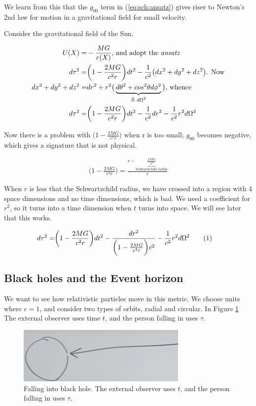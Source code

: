 \documentclass[]{article}
\newcommand\numberthis{\addtocounter{equation}{1}\tag{\theequation}}
\begin{document}
{We learn from this that the $g_00$ term in (\ref{eq:sch:ansatz}) gives riser to Newton's 2nd law for motion in a gravitational field for small velocity.

Consider the gravitational field of the Sun.

\begin{align*}
	U(X) =& - \frac{MG}{r(X)} \text{, and adopt the \emph{ansatz}}\\
		d \tau^2 =& \bigg(1-\frac{2 MG}{c^2 r}\bigg) dt^2 - \frac{1}{c^2} \big(dx^2 + dy^2 +dz^2\big) \text{. Now}\\
		dx^2 + dy^2 +dz^2 =& dr^2 + r^2 \big(\underbrace{d\theta^2 + cos^2 \theta d\phi^2}_\text{$\triangleq d\Omega^2$}\big) \text{, whence}\\
		d \tau^2 =& \bigg(1-\frac{2 MG}{c^2 r}\bigg) dt^2 - \frac{1}{c^2}dr^2 - \frac{1}{c^2} r^2 d\Omega^2
\end{align*}

Now there is a problem with $\bigg(1-\frac{2 MG}{c^2 r}\bigg)$ when r is too small; $g_00$ becomes negative, which gives a signature that is not physical.

\begin{align*}
	\bigg(1-\frac{2 MG}{c^2 r}\bigg) = \frac{r-\underbrace{\frac{2 MG}{c^2}}_\text{Schwartzchild radius}}{r}
\end{align*}

When $r$ is less that the Schwartzchild radius, we have crossed into a region with 4 space dimensions and no time dimensions, which is bad. We need a coefficient for $r^2$, so it turns into a time dimension when $t$ turns into space. We will see later that this works.

\begin{align*}
	d \tau^2 =& \bigg(1-\frac{2 MG}{c^2 r}\bigg) dt^2 - \frac{dr^2}{\bigg(1-\frac{2 MG}{c^2 r}\bigg)c^2} - \frac{1}{c^2} r^2 d\Omega^2 \numberthis \label{eq:schwartzchild}
\end{align*}

\subsection{Black holes and the Event horizon}

We want to see how relativistic particles move in this metric. We choose units where $c=1$, and consider two types of orbits, radial and circular. In Figure \ref{fig:gr-5-falling-in}  The external observer uses time $t$, and the person falling in uses $\tau$.

\begin{figure}[H]
	\caption[Falling into black hole]{Falling into black hole. The external observer uses $t$, and the person falling in uses $\tau$.}\label{fig:gr-5-falling-in}
	\includegraphics{gr-5-falling-in}	
\end{figure}

}
\end{document}

